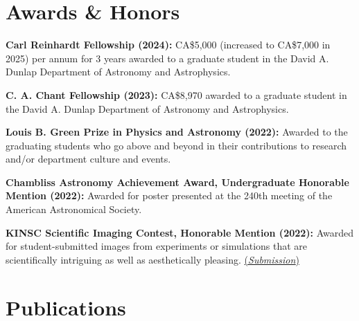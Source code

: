 \documentclass[letterpaper,11pt]{article}
\newcommand{\resumeSubHeadingListStart}{\begin{itemize}[leftmargin=0.15in, label={}]}
\newcommand{\resumeSubHeadingListEnd}{\end{itemize}}
\begin{document}
\section{Awards \& Honors}
  \vspace{2pt}
  \resumeSubHeadingListStart
    \small{\item{
        \textbf{Carl Reinhardt Fellowship (2024):}{ CA\$5,000 (increased to CA\$7,000 in 2025) per annum for 3 years awarded to a graduate student in the David A. Dunlap Department of Astronomy and Astrophysics.} \\ \vspace{3pt}
    
        \textbf{C. A. Chant Fellowship (2023):}{ CA\$8,970 awarded to a graduate student in the David A. Dunlap Department of Astronomy and Astrophysics.} \\ \vspace{3pt}
    
        \textbf{Louis B. Green Prize in Physics and Astronomy (2022):}{ Awarded to the graduating students who go above and beyond in their contributions to research and/or department culture and events.} \\ \vspace{3pt}
    
        \textbf{Chambliss Astronomy Achievement Award, Undergraduate Honorable Mention (2022):}{ Awarded for poster presented at the 240th meeting of the American Astronomical Society.} \\ \vspace{3pt}

        \textbf{KINSC Scientific Imaging Contest, Honorable Mention (2022):}{ Awarded for student-submitted images from experiments or simulations that are scientifically intriguing as well as aesthetically pleasing. \href{https://www.haverford.edu/college-communications/news/2022-kinsc-scientific-imaging-contest-winners-announced}{(\emph{\color{blue}Submission})}}
    }}
  \resumeSubHeadingListEnd


\section{Publications}
    \vspace{3pt}

    \nocite{*}
    \printbibliography[heading=none]

\end{document}
